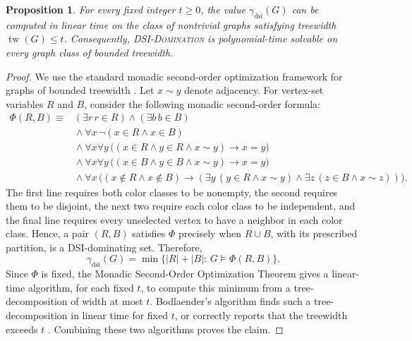 \documentclass[11pt]{article}
\newtheorem{proposition}[theorem]{Proposition}
\theoremstyle{definition}
\theoremstyle{remark}
\newcommand{\dsi}{\mathrm{dsi}}
\newcommand{\tw}{\operatorname{tw}}
\begin{document}
\begin{proposition}
\label{prop:bounded-treewidth}
For every fixed integer \(t\ge 0\), the value \(\gamma_{\dsi}(G)\) can be
computed in linear time on the class of nontrivial graphs satisfying treewidth 
\(\tw(G)\le t\). Consequently, \textnormal{\textsc{DSI-Domination}} is
polynomial-time solvable on every graph class of bounded treewidth.
\end{proposition}

\begin{proof}
We use the standard monadic second-order optimization framework for graphs of
bounded treewidth \cite{Courcelle90,CourcelleMakowskyRotics00}. Let
\(x\sim y\) denote adjacency. For vertex-set variables \(R\) and \(B\), consider
the following monadic second-order formula:
\[
\begin{aligned}
\Phi(R,B)\equiv{}&
   (\exists r\, r\in R)\land(\exists b\, b\in B)                                      \\
&{}\land \forall x\, \neg(x\in R\land x\in B)                                         \\
&{}\land \forall x\forall y\,
   \bigl((x\in R\land y\in R\land x\sim y)\rightarrow x=y\bigr)                       \\
&{}\land \forall x\forall y\,
   \bigl((x\in B\land y\in B\land x\sim y)\rightarrow x=y\bigr)                       \\
&{}\land \forall x\,
   \bigl((x\notin R\land x\notin B)\rightarrow
      (\exists y\,(y\in R\land x\sim y)\land
       \exists z\,(z\in B\land x\sim z))\bigr).
\end{aligned}
\]
The first line requires both color classes to be nonempty, the second requires
them to be disjoint, the next two require each color class to be independent,
and the final line requires every unselected vertex to have a neighbor in each
color class. Hence, a pair \((R,B)\) satisfies \(\Phi\) precisely when
\(R\cup B\), with its prescribed partition, is a DSI-dominating set.
Therefore,
\[
   \gamma_{\dsi}(G)=
   \min\{|R|+|B|:\, G\models \Phi(R,B)\}.
\]
Since \(\Phi\) is fixed, the Monadic Second-Order Optimization Theorem gives a
linear-time algorithm, for each fixed \(t\), to compute this minimum from a
tree-decomposition of width at most \(t\). Bodlaender's algorithm finds such a
tree-decomposition in linear time for fixed \(t\), or correctly reports that
the treewidth exceeds \(t\) \cite{Bodlaender96}. Combining these two algorithms
proves the claim.
\end{proof}
\end{document}
